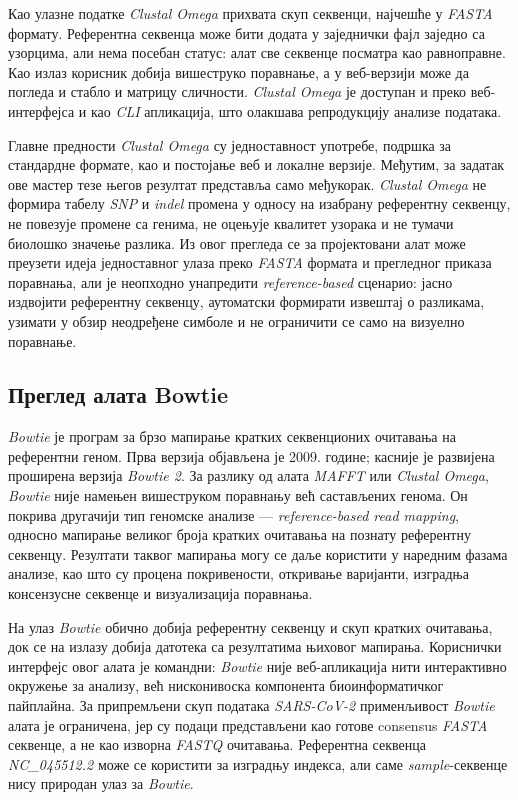 \documentclass[12pt,oneside]{memoir}
\begin{document}
Као улазне податке \textit{Clustal Omega} прихвата скуп секвенци, најчешће у \textit{FASTA} формату. Референтна секвенца може бити додата у заједнички фајл заједно са узорцима, али нема посебан статус: алат све секвенце посматра као равноправне. Као излаз корисник добија вишеструко поравнање, а у веб-верзији може да погледа и стабло и матрицу сличности. \textit{Clustal Omega} је доступан и преко веб-интерфејса и као \textit{CLI} апликација, што олакшава репродукцију анализе података.

Главне предности \textit{Clustal Omega} су једноставност употребе, подршка за стандардне формате, као и постојање веб и локалне верзије. Међутим, за задатак ове мастер тезе његов резултат представља само међукорак. \textit{Clustal Omega} не формира табелу \textit{SNP} и \textit{indel} промена у односу на изабрану референтну секвенцу, не повезује промене са генима, не оцењује квалитет узорака и не тумачи биолошко значење разлика. Из овог прегледа се за пројектовани алат може преузети идеја једноставног улаза преко \textit{FASTA} формата и прегледног приказа поравнања, али је неопходно унапредити \textit{reference-based} сценарио: јасно издвојити референтну секвенцу, аутоматски формирати извештај о разликама, узимати у обзир неодређене симболе и не ограничити се само на визуелно поравнање.

\subsection{Преглед алата Bowtie}
\textit{Bowtie} је програм за брзо мапирање кратких секвенционих очитавања на референтни геном. Прва верзија објављена је 2009. године\cite{langmead2009bowtie}; касније је развијена проширена верзија \textit{Bowtie 2}\cite{langmead2012bowtie2}. За разлику од алата \textit{MAFFT} или \textit{Clustal Omega}, \textit{Bowtie} није намењен вишеструком поравнању већ састављених генома. Он покрива другачији тип геномске анализе — \textit{reference-based read mapping}, односно мапирање великог броја кратких очитавања на познату референтну секвенцу. Резултати таквог мапирања могу се даље користити у наредним фазама анализе, као што су процена покривености, откривање варијанти, изградња консензусне секвенце и визуализација поравнања.

На улаз \textit{Bowtie} обично добија референтну секвенцу и скуп кратких очитавања, док се на излазу добија датотека са резултатима њиховог мапирања. Кориснички интерфејс овог алата је командни: \textit{Bowtie} није веб-апликација нити интерактивно окружење за анализу, већ нисконивоска компонента биоинформатичког пайплайна. За припремљени скуп података \textit{SARS-CoV-2} применљивост \textit{Bowtie} алата је ограничена, јер су подаци представљени као готове consensus \textit{FASTA} секвенце, а не као изворна \textit{FASTQ} очитавања. Референтна секвенца \textit{NC\_045512.2} може се користити за изградњу индекса, али саме \textit{sample}-секвенце нису природан улаз за \textit{Bowtie}.
\end{document}
